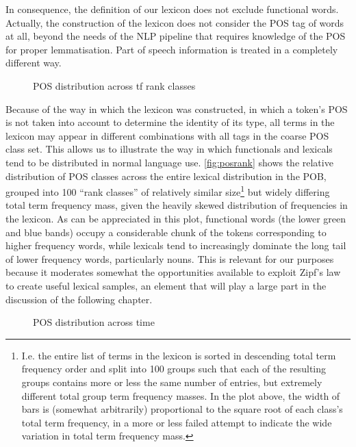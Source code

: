 In consequence, the definition of our lexicon does not exclude functional words.
Actually, the construction of the lexicon does not consider the POS tag of words at all, beyond the needs of the NLP pipeline that requires knowledge of the POS for proper lemmatisation.
Part of speech information is treated in a completely different way.

\begin{figure}
    \centerfloat
    
    \caption{POS distribution across tf rank classes}
    \label{fig:posrank}
\end{figure}

Because of the way in which the lexicon was constructed, in which a token's POS is not taken into account to determine the identity of its type, all terms in the lexicon may appear in different combinations with all tags in the coarse POS class set.
This allows us to illustrate the way in which functionals and lexicals tend to be distributed in normal language use.
\autoref{fig:posrank} shows the relative distribution of POS classes across the entire lexical distribution in the POB, grouped into 100 ``rank classes'' of relatively similar size\footnote{
    \label{foot:rankclasses}
    I.e. the entire list of terms in the lexicon is sorted in descending total term frequency order and split into 100 groups such that each of the resulting groups contains more or less the same number of entries, but extremely different total group term frequency masses.
    In the plot above, the width of bars is (somewhat arbitrarily) proportional to the square root of each class's total term frequency, in a more or less failed attempt to indicate the wide variation in total term frequency mass.
} but widely differing total term frequency mass, given the heavily skewed distribution of frequencies in the lexicon.
As can be appreciated in this plot, functional words (the lower green and blue bands) occupy a considerable chunk of the tokens corresponding to higher frequency words, while lexicals tend to increasingly dominate the long tail of lower frequency words, particularly nouns.
This is relevant for our purposes because it moderates somewhat the opportunities available to exploit Zipf's law to create useful lexical samples, an element that will play a large part in the discussion of the following chapter.

\begin{figure}
    \centerfloat
    
    \caption{POS distribution across time}
    \label{fig:postime}
\end{figure}

